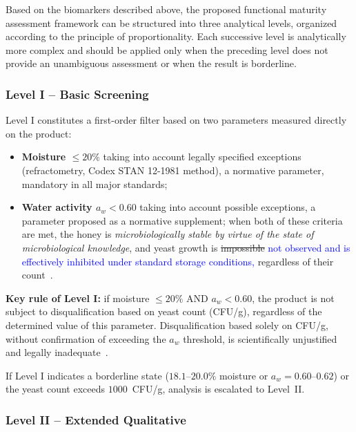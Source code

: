 Based on the biomarkers described above, the proposed functional maturity assessment framework can be structured into three analytical levels, organized according to the principle of proportionality. Each successive level is analytically more complex and should be applied only when the preceding level does not provide an unambiguous assessment or when the result is borderline.

\subsubsection{Level I -- Basic Screening}

Level I constitutes a first-order filter based on two parameters
measured directly on the product:

\begin{itemize}
    \item \textbf{Moisture $\leq 20\%$} taking into account
          legally specified exceptions (refractometry,
          Codex STAN 12-1981 method), a normative parameter,
          mandatory in all major standards;
    \item \textbf{Water activity $a_w < 0.60$} taking into
          account possible exceptions, a parameter proposed as
          a normative supplement; when both of these criteria
          are met, the honey is \emph{microbiologically stable
          by virtue of the state of microbiological knowledge},
          and yeast growth is \sout{impossible} \textcolor{blue}{not observed and is effectively inhibited under standard storage conditions,}
          regardless of their count~\cite{ruegg1981,waaw2006}.
\end{itemize}

\textbf{Key rule of Level I:} if moisture $\leq 20\%$
\textsc{AND} $a_w < 0.60$, the product is not subject to
disqualification based on yeast count (CFU/g), regardless of the
determined value of this parameter. Disqualification based solely
on CFU/g, without confirmation of exceeding the $a_w$ threshold,
is scientifically unjustified and legally
inadequate~\cite{codex_stan12,eudir2001110}.

If Level I indicates a borderline state ($18.1$--$20.0\%$
moisture or $a_w = 0.60$--$0.62$) or the yeast count exceeds
$1000$~CFU/g, analysis is escalated to Level~II.

\subsubsection{Level II -- Extended Qualitative}


